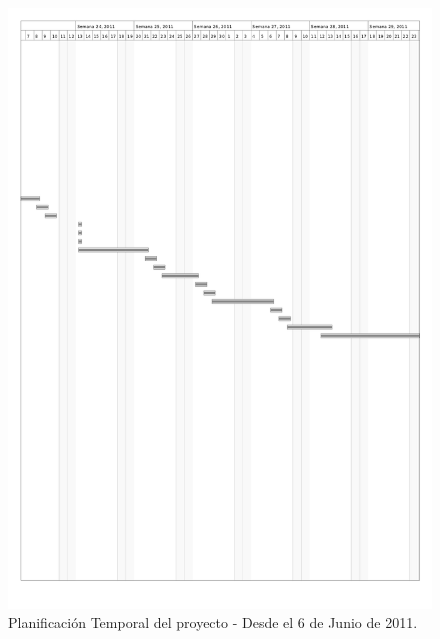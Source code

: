 \pagebreak
\begin{figure}[H]
\begin{center}
\includegraphics[width=15.5cm]{planificacion_graphvisualx_2.png}
\caption{Planificación Temporal del proyecto - Desde el 6 de Junio de 2011.}
\end{center}
\end{figure}

